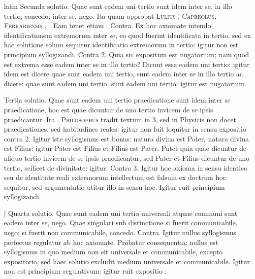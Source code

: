 \begin{otherlanguage*}{latin}
\pstart
 Secunda solutio. Quae sunt eadem uni tertio sunt idem inter se, in illo tertio, concedo; inter se, nego. Ita  quam approbat \textsc{Lulius} , \textsc{Capreolus}, \textsc{Ferrariensis} , . Eam tenet etiam . Contra. Ex hoc axiomate intendo identificationem extremorum inter se, eo quod fuerint identificata in tertio, sed ex hac solutione solum sequitur identificatio extremorum in tertio: igitur non est principium syllogizandi. Contra 2. Quia sic expositum est nugatorium; nam quod est extrema esse eadem inter se in illo tertio? Dicunt esse eadem uni tertio: igitur idem est dicere quae sunt eadem uni tertio, sunt eadem inter se in illo tertio ac dicere: quae sunt eadem uni tertio, sunt eadem uni tertio: igitur est nugatorium. 
\pend

\pstart
 Tertia solutio. Quae sunt eadem uni tertio praedicatione sunt idem inter se praedicatione, hoc est quae dicuntur de uno tertio invicem de se ipsis praedicantur. Ita . \textsc{Philosophus} tradit textum in  3, sed in Physicis non docet praedicationes, sed habitudines reales: igitur non fuit loquitur in sensu expositio contra 2. Igitur iste syllogismus est bonus: natura divina est Pater, natura divina est Filius: igitur Pater est Filius et Filius est Pater. Patet quia quae dicuntur de aliquo tertio invicem de se ipsis praedicantur, sed Pater et Filius dicuntur de uno tertio, scilicet de divinitate: igitur. Contra 3. Igitur hoc axioma in sensu identico seu de identitate reali extremorum intellectum est falsum ex doctrina hoc sequitur, sed argumentatio utitur illo in sensu hoc. Igitur ruit principium syllogizandi. 
\pend

\pstart
 \textnormal{|}  Quarta solutio. Quae sunt eadem uni tertio universali atquae communi sunt eadem inter se, nego. Quae singulari sub distinctione si fuerit communicabile, nego; si fuerit non communicabile, concedo. Contra. Igitur nullus syllogismus perfectus regulatur ab hoc axiomate. Probatur consequentia: nullus est syllogismus in quo medium non sit universale et communicabile, excepto expositorio, sed haec solutio excludit medium universale et communicabile. Igitur non est principium regulativum: igitur ruit expositio . 
\pend


\end{otherlanguage*}
